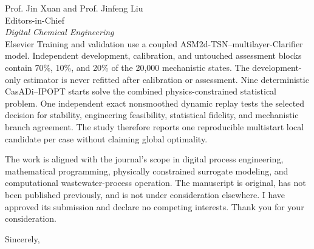 \documentclass[11pt]{letter}
\begin{document}
\begin{letter}{Prof. Jin Xuan and Prof. Jinfeng Liu\\
Editors-in-Chief\\
\textit{Digital Chemical Engineering}\\
Elsevier}
Training and validation use a coupled ASM2d-TSN--multilayer-Clarifier model. Independent development, calibration, and untouched assessment blocks contain 70\%, 10\%, and 20\% of the 20,000 mechanistic states. The development-only estimator is never refitted after calibration or assessment. Nine deterministic CasADi--IPOPT starts solve the combined physics-constrained statistical problem. One independent exact nonsmoothed dynamic replay tests the selected decision for stability, engineering feasibility, statistical fidelity, and mechanistic branch agreement. The study therefore reports one reproducible multistart local candidate per case without claiming global optimality.

The work is aligned with the journal's scope in digital process engineering, mathematical programming, physically constrained surrogate modeling, and computational wastewater-process operation. The manuscript is original, has not been published previously, and is not under consideration elsewhere. I have approved its submission and declare no competing interests. Thank you for your consideration.

\closing{Sincerely,}

\end{letter}
\end{document}
